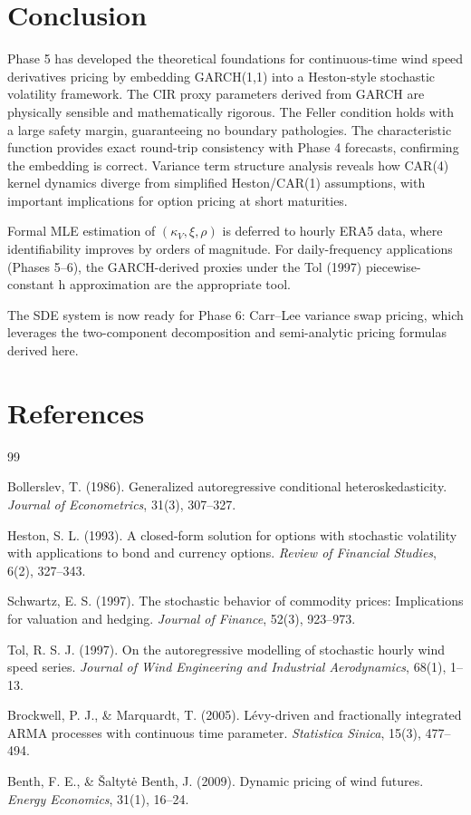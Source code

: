 \documentclass[11pt, a4paper, twoside]{article}
\begin{document}
\section{Conclusion}

Phase 5 has developed the theoretical foundations for continuous-time wind speed derivatives pricing by embedding GARCH(1,1) into a Heston-style stochastic volatility framework. The CIR proxy parameters derived from GARCH are physically sensible and mathematically rigorous. The Feller condition holds with a large safety margin, guaranteeing no boundary pathologies. The characteristic function provides exact round-trip consistency with Phase 4 forecasts, confirming the embedding is correct. Variance term structure analysis reveals how CAR(4) kernel dynamics diverge from simplified Heston/CAR(1) assumptions, with important implications for option pricing at short maturities.

Formal MLE estimation of $(\kappa_V, \xi, \rho)$ is deferred to hourly ERA5 data, where identifiability improves by orders of magnitude. For daily-frequency applications (Phases 5--6), the GARCH-derived proxies under the Tol (1997) piecewise-constant h approximation are the appropriate tool.

The SDE system is now ready for Phase 6: Carr--Lee variance swap pricing, which leverages the two-component decomposition and semi-analytic pricing formulas derived here.

\section*{References}

\begin{thebibliography}{99}

Bollerslev, T. (1986). Generalized autoregressive conditional heteroskedasticity. \textit{Journal of Econometrics}, 31(3), 307--327.

Heston, S. L. (1993). A closed-form solution for options with stochastic volatility with applications to bond and currency options. \textit{Review of Financial Studies}, 6(2), 327--343.

Schwartz, E. S. (1997). The stochastic behavior of commodity prices: Implications for valuation and hedging. \textit{Journal of Finance}, 52(3), 923--973.

Tol, R. S. J. (1997). On the autoregressive modelling of stochastic hourly wind speed series. \textit{Journal of Wind Engineering and Industrial Aerodynamics}, 68(1), 1--13.

Brockwell, P. J., \& Marquardt, T. (2005). Lévy-driven and fractionally integrated ARMA processes with continuous time parameter. \textit{Statistica Sinica}, 15(3), 477--494.

Benth, F. E., \& Šaltytė Benth, J. (2009). Dynamic pricing of wind futures. \textit{Energy Economics}, 31(1), 16--24.

\end{thebibliography}
\end{document}
